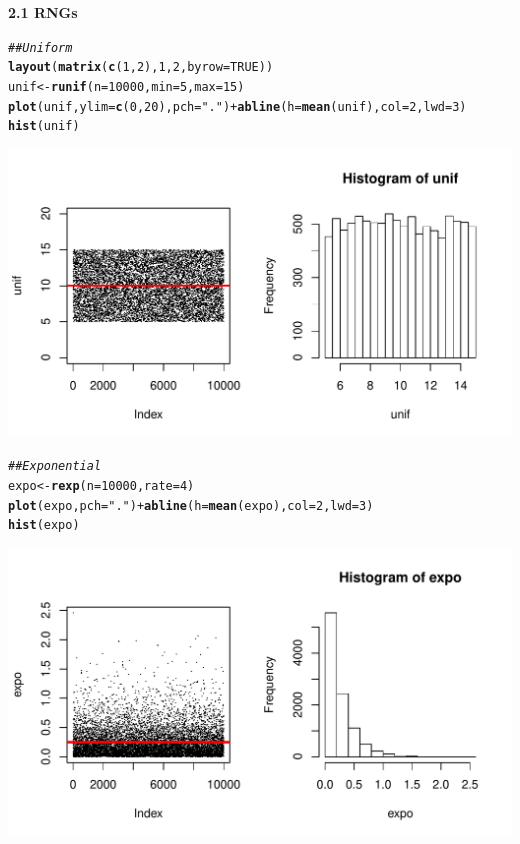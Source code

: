 \documentclass{article}\usepackage[]{graphicx}\usepackage[]{color}
\makeatletter
\newcommand{\hlnum}[1]{\textcolor[rgb]{0.686,0.059,0.569}{#1}}%
\newcommand{\hlstr}[1]{\textcolor[rgb]{0.192,0.494,0.8}{#1}}%
\newcommand{\hlcom}[1]{\textcolor[rgb]{0.678,0.584,0.686}{\textit{#1}}}%
\newcommand{\hlopt}[1]{\textcolor[rgb]{0,0,0}{#1}}%
\newcommand{\hlstd}[1]{\textcolor[rgb]{0.345,0.345,0.345}{#1}}%
\newcommand{\hlkwb}[1]{\textcolor[rgb]{0.69,0.353,0.396}{#1}}%
\newcommand{\hlkwc}[1]{\textcolor[rgb]{0.333,0.667,0.333}{#1}}%
\newcommand{\hlkwd}[1]{\textcolor[rgb]{0.737,0.353,0.396}{\textbf{#1}}}%
\newenvironment{kframe}{%
 \def\at@end@of@kframe{}%
 \ifinner\ifhmode%
  \def\at@end@of@kframe{\end{minipage}}%
  \begin{minipage}{\columnwidth}%
 \fi\fi%
 \def\FrameCommand##1{\hskip\@totalleftmargin \hskip-\fboxsep
 \colorbox{shadecolor}{##1}\hskip-\fboxsep
     \hskip-\linewidth \hskip-\@totalleftmargin \hskip\columnwidth}%
 \MakeFramed {\advance\hsize-\width
   \@totalleftmargin\z@ \linewidth\hsize
   \@setminipage}}%
 {\par\unskip\endMakeFramed%
 \at@end@of@kframe}
\newenvironment{knitrout}{}{} %
\makeatother
\begin{document}
\bf{2.1 RNGs}
\begin{knitrout}
\color{fgcolor}\begin{kframe}
\begin{alltt}
\hlcom{## Uniform}
\hlkwd{layout}\hlstd{(}\hlkwd{matrix}\hlstd{(}\hlkwd{c}\hlstd{(}\hlnum{1}\hlstd{,} \hlnum{2}\hlstd{),} \hlnum{1}\hlstd{,} \hlnum{2}\hlstd{,} \hlkwc{byrow} \hlstd{=} \hlnum{TRUE}\hlstd{))}
\hlstd{unif} \hlkwb{<-} \hlkwd{runif}\hlstd{(}\hlkwc{n} \hlstd{=} \hlnum{10000}\hlstd{,} \hlkwc{min} \hlstd{=} \hlnum{5}\hlstd{,} \hlkwc{max} \hlstd{=} \hlnum{15}\hlstd{)}
\hlkwd{plot}\hlstd{(unif,} \hlkwc{ylim} \hlstd{=} \hlkwd{c}\hlstd{(}\hlnum{0}\hlstd{,} \hlnum{20}\hlstd{),} \hlkwc{pch} \hlstd{=} \hlstr{"."}\hlstd{)} \hlopt{+} \hlkwd{abline}\hlstd{(}\hlkwc{h} \hlstd{=} \hlkwd{mean}\hlstd{(unif),} \hlkwc{col} \hlstd{=} \hlnum{2}\hlstd{,} \hlkwc{lwd} \hlstd{=} \hlnum{3}\hlstd{)}
\hlkwd{hist}\hlstd{(unif)}
\end{alltt}
\end{kframe}
\includegraphics[width=.5\linewidth]{figure/RNG1} 
\begin{kframe}\begin{alltt}
\hlcom{## Exponential}
\hlstd{expo} \hlkwb{<-} \hlkwd{rexp}\hlstd{(}\hlkwc{n} \hlstd{=} \hlnum{10000}\hlstd{,} \hlkwc{rate} \hlstd{=} \hlnum{4}\hlstd{)}
\hlkwd{plot}\hlstd{(expo,} \hlkwc{pch} \hlstd{=} \hlstr{"."}\hlstd{)} \hlopt{+} \hlkwd{abline}\hlstd{(}\hlkwc{h} \hlstd{=} \hlkwd{mean}\hlstd{(expo),} \hlkwc{col} \hlstd{=} \hlnum{2}\hlstd{,} \hlkwc{lwd} \hlstd{=} \hlnum{3}\hlstd{)}
\hlkwd{hist}\hlstd{(expo)}
\end{alltt}
\end{kframe}
\includegraphics[width=.5\linewidth]{figure/RNG2} 

\end{knitrout}
\end{document}
